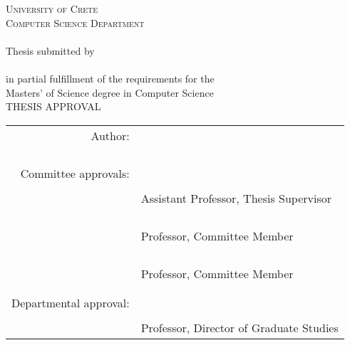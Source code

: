 \documentclass[a4paper,11pt,twoside,openany]{book}
\begin{document}
\begin{titlepage}

\begin{center}
\textsc{University of Crete}\\
\textsc{Computer Science Department}\\
\vspace{0.4cm}
\noindent {\textbf{\thesistitle{}}}\\
\vspace{0.4cm}
\noindent Thesis submitted by\\
\textbf{\owner{}}\\
in partial fulfillment of the requirements for the\\
Masters' of Science degree in Computer Science\\
\vspace{0.4cm} THESIS APPROVAL

\vspace{0.4cm}

\begin{tabular}{rl}
\\
Author: & \underline{\phantom{123456789012345678901234567890123456789012}}\\
    & \owner{}\\
    \\
    \\
    \\
Committee approvals: & \underline{\phantom{123456789012345678901234567890123456789012}}\\
    & \firstprof{}\\
    & {\small Assistant Professor, Thesis Supervisor}\\
    \vspace{0.2cm}
    \\
    \\
& \underline{\phantom{123456789012345678901234567890123456789012}}\\
    & \secondprof{}\\
    & {\small Professor, Committee Member}\\
    \vspace{0.2cm}
    \\
    \\
& \underline{\phantom{123456789012345678901234567890123456789012}}\\
    & \thirdprof{}\\
    & {\small  Professor, Committee Member}\\
    \vspace{0.2cm}
    \\
    \\
\hspace{1.4ex}Departmental approval: & \underline{\phantom{123456789012345678901234567890123456789012}}\\
    & \csdchair{}\\
    & {\small Professor, Director of Graduate Studies}\\
\end{tabular}
\\


\end{center}
\end{titlepage}
\end{document}
